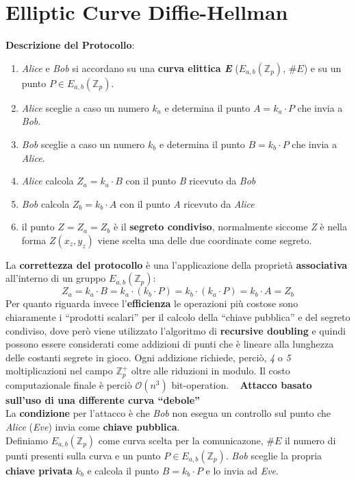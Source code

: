 \section{Elliptic Curve Diffie-Hellman}
\textbf{Descrizione del Protocollo}:
\begin{enumerate}
    \item \textit{Alice} e \textit{Bob} si accordano su una \textbf{curva elittica \textit{E}} ($E_{a,b}(\mathbb{Z}_p)$, $\#E$) e su un punto $P \in E_{a,b}(\mathbb{Z}_p)$.
    \item \textit{Alice} sceglie a caso un numero $k_a$ e determina il punto $A = k_a \cdot P$ che invia a \textit{Bob}.
    \item \textit{Bob} sceglie a caso un numero $k_b$ e determina il punto $B = k_b \cdot P$ che invia a \textit{Alice}.
    \item \textit{Alice} calcola $Z_a = k_a \cdot B$ con il punto \textit{B} ricevuto da \textit{Bob}
    \item \textit{Bob} calcola $Z_b = k_b \cdot A$ con il punto \textit{A} ricevuto da \textit{Alice}
    \item il punto $Z = Z_a = Z_b$ è il \textbf{segreto condiviso}, normalmente siccome \textit{Z} è nella forma $Z(x_z, y_z)$ viene scelta una delle due coordinate come segreto.
\end{enumerate}
La \textbf{correttezza del protocollo} è una l'applicazione della proprietà \textbf{associativa} all'interno di un gruppo $E_{a,b}(\mathbb{Z}_p)$:
$$Z_a = k_a \cdot B = k_a \cdot (k_b \cdot P) = k_b \cdot (k_a \cdot P) = k_b \cdot A = Z_b$$
Per quanto riguarda invece l'\textbf{efficienza} le operazioni più costose sono chiaramente i ``prodotti scalari'' per il calcolo della ``chiave pubblica'' e del segreto condiviso, dove però viene utilizzato l'algoritmo di \textbf{recursive doubling} e quindi possono essere considerati come addizioni di punti che è lineare alla lunghezza delle costanti segrete in gioco. Ogni addizione richiede, perciò, \textit{4} o \textit{5} moltiplicazioni nel campo $\mathbb{Z}_p^+$ oltre alle riduzioni in modulo. Il costo computazionale finale è perciò $\mathcal{O}(n^3)$ bit-operation.
\   \newpage
\textbf{Attacco basato sull'uso di una differente curva ``debole''} \\
La \textbf{condizione} per l'attacco è che \textit{Bob} non esegua un controllo sul punto che \textit{Alice} (\textit{Eve}) invia come \textbf{chiave pubblica}. \\
Definiamo $E_{a, b}(\mathbb{Z}_p)$ come curva scelta per la comunicazone, $\#E$ il numero di punti presenti sulla curva e un punto $P \in E_{a, b}(\mathbb{Z}_p)$. \textit{Bob} sceglie la propria \textbf{chiave privata} $k_b$ e calcola il punto $B = k_b \cdot P$ e lo invia ad \textit{Eve}. \\
